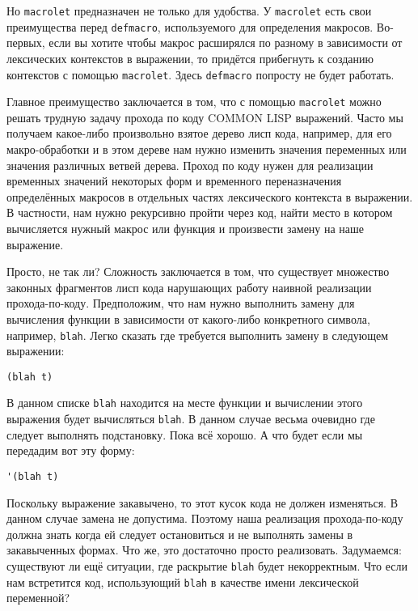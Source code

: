 Но \verb"macrolet" предназначен не только для удобства. У \verb"macrolet" есть свои преимущества перед \verb"defmacro", используемого для определения макросов. Во-первых, если вы хотите чтобы макрос расширялся по разному в зависимости от лексических контекстов в выражении, то придётся прибегнуть к созданию контекстов с помощью \verb"macrolet". Здесь \verb"defmacro" попросту не будет работать.

Главное преимущество заключается в том, что с помощью \verb"macrolet" можно решать трудную задачу прохода по коду COMMON LISP выражений. Часто мы получаем какое-либо произвольно взятое дерево лисп кода, например, для его макро-обработки и в этом дереве нам нужно изменить значения переменных или значения различных ветвей дерева. Проход по коду нужен для реализации временных значений некоторых форм и временного переназначения определённых макросов в отдельных частях лексического контекста в выражении. В частности, нам нужно рекурсивно пройти через код, найти место в котором вычисляется нужный макрос или функция и произвести замену на наше выражение.

Просто, не так ли? Сложность заключается в том, что существует множество законных фрагментов лисп кода нарушающих работу наивной реализации прохода-по-коду. Предположим, что нам нужно выполнить замену для вычисления функции в зависимости от какого-либо конкретного символа, например, \verb"blah". Легко сказать где требуется выполнить замену в следующем выражении:

\begin{verbatim}
(blah t)
\end{verbatim}

В данном списке \verb"blah" находится на месте функции и вычислении этого выражения будет вычисляться \verb"blah". В данном случае весьма очевидно где следует выполнять подстановку. Пока всё хорошо. А что будет если мы передадим вот эту форму:

\begin{verbatim}
'(blah t)
\end{verbatim}

Поскольку выражение закавычено, то этот кусок кода не должен изменяться. В данном случае замена не допустима. Поэтому наша реализация прохода-по-коду должна знать когда ей следует остановиться и не выполнять замены в закавыченных формах. Что же, это достаточно просто реализовать. Задумаемся: существуют ли ещё ситуации, где раскрытие \verb"blah" будет некорректным. Что если нам встретится код, использующий \verb"blah" в качестве имени лексической переменной?

